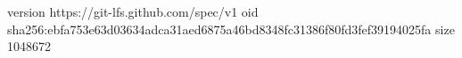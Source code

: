 version https://git-lfs.github.com/spec/v1
oid sha256:ebfa753e63d03634adca31aed6875a46bd8348fc31386f80fd3fef39194025fa
size 1048672
